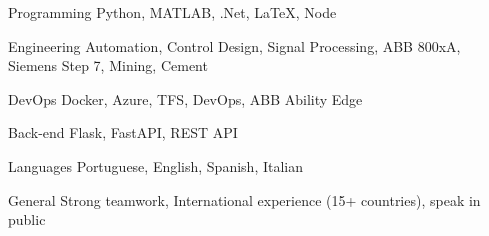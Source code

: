 

\begin{cvskills}

  \cvskill
    {Programming} %
    {Python, MATLAB, .Net, LaTeX, Node} %

  \cvskill
    {Engineering} %
    {Automation, Control Design, Signal Processing, ABB 800xA, Siemens Step 7, Mining, Cement} %
  
  \cvskill
    {DevOps} %
    {Docker, Azure, TFS, DevOps, ABB Ability Edge} %

  \cvskill
    {Back-end} %
    {Flask, FastAPI, REST API} %

  \cvskill
    {Languages} %
    {Portuguese, English, Spanish, Italian} %

  \cvskill
    {General} %
    {Strong teamwork, International experience (15+ countries), speak in public} %

\end{cvskills}
